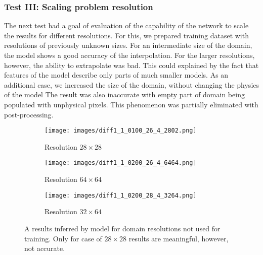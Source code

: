 \subsubsection{Test III: Scaling problem resolution}
The next test had a goal of evaluation of the capability of the network to scale the results for different resolutions.
For this, we prepared training dataset with resolutions of previously unknown sizes.
For an intermediate size of the domain, the model shows a good accuracy of the interpolation.
For the larger resolutions, however, the ability to extrapolate was bad.
This could explained by the fact that features of the model describe only parts of much smaller models.
As an additional case, we increased the size of the domain, without changing the physics of the model
The result was also inaccurate with empty part of domain being populated with unphysical pixels.
This phenomenon was partially eliminated with post-processing.
\begin{figure}[h]
	\begin{subfigure}[b]{0.3\linewidth}
		\centering
		\texttt{[image: images/diff1\_1\_0100\_26\_4\_2802.png]}
		\caption{Resolution $28 \times 28$}
		\label{fig:resols_1}
	\end{subfigure}
	\begin{subfigure}[b]{0.3\linewidth}
	\centering
	\texttt{[image: images/diff1\_1\_0200\_26\_4\_6464.png]}
	\caption{Resolution $64 \times 64$}
	\label{fig:resols_2}
\end{subfigure}
	\begin{subfigure}[b]{0.3\linewidth}
	\centering
	\texttt{[image: images/diff1\_1\_0200\_28\_4\_3264.png]}
	\caption{Resolution $32 \times 64$}
	\label{fig:resols_3}
\end{subfigure}
	\caption{A results inferred by model for domain resolutions not used for training. Only for case of $28\times 28$ results are meaningful, however, not accurate. }
	\label{fig:resols}
\end{figure}
\medskip

